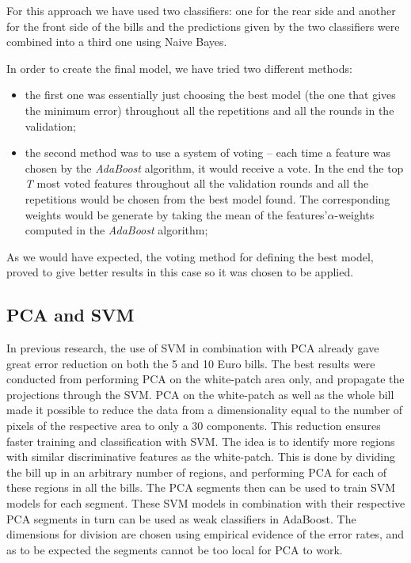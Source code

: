 \documentclass[11pt,twocolumn]{article}
\begin{document}
			For this approach we have used two classifiers: one for the rear side and another for the front side of the bills and the predictions	given by the two classifiers were combined into a third one using Naive Bayes.

			In order to create the final model, we have tried two different methods:
			\begin{itemize}
				\item the first one was essentially just choosing the best model (the one
				that gives the minimum error) throughout all the repetitions and all the
				rounds in the validation;
				\item the second method was to use a system of voting -- each time a
				feature was chosen by the \emph{AdaBoost} algorithm, it would receive a
				vote. In the end the top \emph{T} most voted features throughout all the
				validation rounds and all the repetitions would be chosen from the
				best model found. The corresponding weights would be generate by taking the
				mean of the features\rq\@ $\alpha$-weights computed in the \emph{AdaBoost}
				algorithm;
			\end{itemize}

			As we would have expected, the voting method for defining the best model, proved to give better results in this case so it was chosen to be applied.

		\subsection{PCA and SVM}\label{sec:PCA}
			In previous research, the use of SVM in combination with PCA already gave great error reduction on both the 5 and 10 Euro bills. The best results were conducted from performing PCA on the white-patch area only, and propagate the projections through the SVM. PCA on the white-patch as well as the whole bill made it possible to reduce the data from a dimensionality equal to the number of pixels of the respective area to only a 30 components. This reduction ensures faster training and classification with SVM. The idea is to identify more regions with similar discriminative features as the white-patch. This is done by dividing the bill up in an arbitrary number of regions, and performing PCA for each of these regions in all the bills. The PCA segments then can be used to train SVM models for each segment. These SVM models in combination with their respective PCA segments in turn can be used as weak classifiers in AdaBoost. The dimensions for division are chosen using empirical evidence of the error rates, and as to be expected the segments cannot be too local for PCA to work.
\end{document}
